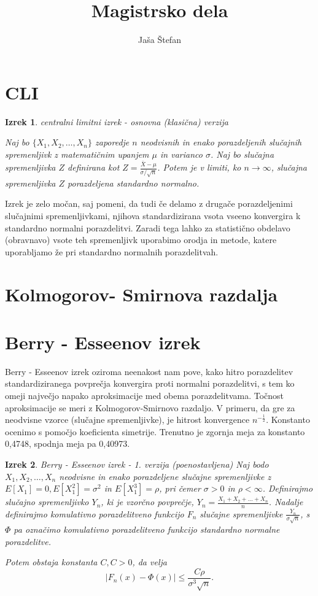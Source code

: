 \documentclass[12pt]{article}
\title{Magistrsko dela}
\author{Jaša Štefan}
\newtheorem{theorem}{Izrek}
\begin{document}
\maketitle

\section{CLI}
\begin{theorem}{centralni limitni izrek - osnovna (klasična) verzija}

Naj bo $\{X_1, X_2, \dots, X_n\}$ zaporedje $n$ neodvisnih in enako porazdeljenih slučajnih spremenljivk z matematičnim upanjem $\mu$ in varianco $\sigma$. Naj bo slučajna spremenljivka $Z$ definirana kot $Z = \frac{\bar{X} - \mu}{\sigma / \sqrt{n}}$.  Potem je v limiti, ko $n \rightarrow \infty$, slučajna spremenljivka $Z$ porazdeljena standardno normalno.
\end{theorem}

Izrek je zelo močan, saj pomeni, da tudi če delamo z drugače porazdeljenimi slučajnimi spremenljivkami, njihova standardizirana vsota vseeno konvergira k standardno normalni porazdelitvi. Zaradi tega lahko za statistično obdelavo (obravnavo) vsote teh spremenljivk uporabimo orodja in metode, katere uporabljamo že pri standardno normalnih porazdelitvah. 


\section{Kolmogorov- Smirnova razdalja}



\section{Berry - Esseenov izrek}
Berry - Esseenov izrek oziroma neenakost nam pove, kako hitro porazdelitev standardiziranega povprečja konvergira proti normalni porazdelitvi, s tem ko omeji največjo napako aproksimacije med obema porazdelitvama. Točnost aproksimacije se meri z Kolmogorov-Smirnovo razdaljo. V primeru, da gre za neodvisne vzorce (slučajne spremenljivke), je hitrost konvergence $n^{-\frac{1}{2}}$. Konstanto ocenimo s pomočjo koeficienta simetrije. Trenutno je zgornja meja za konstanto 0,4748, spodnja meja pa 0,40973.

\begin{theorem}{Berry - Esseenov izrek - 1. verzija  (poenostavljena)}
Naj bodo $X_1, X_2, \dots ,X_n$ neodvisne in enako porazdeljene slučajne spremenljivke z $E[X_1] = 0, E[X_1^2] = \sigma^2$ in $E[X_1^3] = \rho$, pri čemer $\sigma > 0$ in $\rho < \infty$.  Definirajmo slučajno spremenljivko $Y_n$, ki je vzorčno povprečje, $Y_n = \frac{X_1 + X_2+ \dots +X_n}{n}$. 
Nadalje definirajmo komulativno porazdelitveno funkcijo $F_n$ slučajne spremenljivke $\frac{Y_n}{\sigma\sqrt{n}}$, s $\Phi$ pa označimo komulativno porazdelitveno funkcijo standardno normalne porazdelitve. 

Potem obstaja konstanta $C, C>0$, da velja 
$$ |F_n(x) - \Phi(x)| \leq \frac{C \rho}{\sigma^3\sqrt{n}}.$$
\end{theorem}
\end{document}
